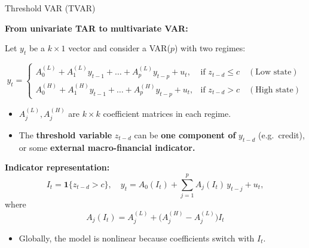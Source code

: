 \documentclass{beamer}
\begin{document}
\begin{frame}{Threshold VAR (TVAR)}
\small

\textbf{From univariate TAR to multivariate VAR:}

Let $y_t$ be a $k \times 1$ vector and consider a VAR($p$) with two regimes:

\[
y_t =
\begin{cases}
A_0^{(L)} + A_1^{(L)} y_{t-1} + \dots + A_p^{(L)} y_{t-p} + u_t,
& \text{if } z_{t-d} \le c \quad (\text{Low state})\\[0.2cm]
A_0^{(H)} + A_1^{(H)} y_{t-1} + \dots + A_p^{(H)} y_{t-p} + u_t,
& \text{if } z_{t-d} > c \quad (\text{High state})
\end{cases}
\]

\begin{itemize}
  \item $A_j^{(L)}, A_j^{(H)}$ are $k \times k$ coefficient matrices in each regime.
  \item The\textbf{ threshold variable} $z_{t-d}$ can be \textbf{one component of }$y_{t-d}$ (e.g.\ credit),
        or some\textbf{ external macro-financial indicator.}
\end{itemize}

\textbf{Indicator representation:}
\[
I_t = \mathbf{1}\{z_{t-d} > c\}, \quad
y_t = A_0(I_t) + \sum_{j=1}^p A_j(I_t)\, y_{t-j} + u_t,
\]
where
\[
A_j(I_t) = A_j^{(L)} + \big(A_j^{(H)} - A_j^{(L)}\big) I_t
\]

\begin{itemize}
  \item Globally, the model is nonlinear because coefficients switch with $I_t$.
\end{itemize}

\end{frame}
\end{document}
